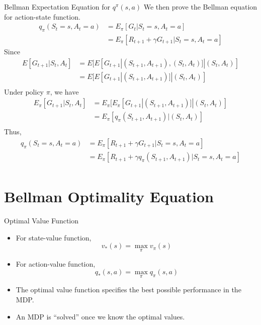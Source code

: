 \documentclass{beamer}
\begin{document}
\begin{frame}{Bellman Expectation Equation for $q^\pi(s,a)$}
    We then prove the Bellman equation for action-state function. 
    \[
    \begin{split}
    q_{\pi}(S_t=s, A_t=a) 
    & = E_{\pi}[G_t |S_t = s, A_t=a] \\
    & = E_{\pi}[R_{t+1} + \gamma G_{t+1}|S_t = s, A_t=a]
    \end{split}
    \]
    Since
    \[
    \begin{split}
        E[G_{t+1}|S_t, A_t] 
        &= E[E[G_{t+1}|(S_{t+1}, A_{t+1}),(S_t, A_t)]|(S_t, A_t)] \\
        &= E[E[G_{t+1}|(S_{t+1}, A_{t+1})]|(S_t, A_t)] \\ 
    \end{split}
    \]
    Under policy $\pi$, we have
    \[
    \begin{split}
        E_{\pi}[G_{t+1}|S_t, A_t] 
        & = E_{\pi}[E_{\pi}[G_{t+1}|(S_{t+1}, A_{t+1})]|(S_t, A_t)] \\
        & = E_{\pi}[q_{\pi}(S_{t+1}, A_{t+1})|(S_t, A_t)] \\
    \end{split}
    \]
    Thus,
    \[
    \begin{split}
    q_{\pi}(S_t=s, A_t=a) 
    & = E_{\pi}[R_{t+1} + \gamma G_{t+1}|S_t = s, A_t=a] \\
    & = E_{\pi}[R_{t+1} + \gamma q_{\pi}(S_{t+1}, A_{t+1})|S_t = s, A_t=a] \\
    \end{split}
    \]

\end{frame}

\section{Bellman Optimality Equation}

\begin{frame}{Optimal Value Function}
    \begin{itemize}
        \item For state-value function,
        \[
        v_*(s) 
        = \max_{\pi} v_\pi (s)
        \]
        
        \item For action-value function,
        \[
        q_*(s, a) 
        = \max_\pi q_\pi(s, a) 
        \]

        \item The optimal value function specifies the best possible
        performance in the MDP.

        \item An MDP is ``solved'' once we know the optimal values.
    \end{itemize}
\end{frame}
\end{document}
